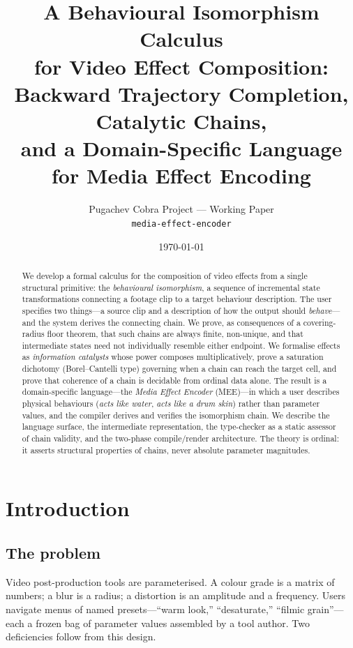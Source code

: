 \documentclass[twocolumn,11pt,a4paper]{article}
\title{\bfseries A Behavioural Isomorphism Calculus\\
for Video Effect Composition:\\
\large Backward Trajectory Completion, Catalytic Chains,\\
and a Domain-Specific Language for Media Effect Encoding}
\author{%
  \normalsize Pugachev Cobra Project --- Working Paper\\
  \small \texttt{media-effect-encoder}
}
\date{\today}
\theoremstyle{mee}
\theoremstyle{definition}
\theoremstyle{remark}
\begin{document}
\maketitle

\begin{abstract}
\noindent
We develop a formal calculus for the composition of video effects from a
single structural primitive: the \emph{behavioural isomorphism}, a
sequence of incremental state transformations connecting a footage clip to
a target behaviour description. The user specifies two things---a source
clip and a description of how the output should \emph{behave}---and the
system derives the connecting chain. We prove, as consequences of a
covering-radius floor theorem, that such chains are always finite,
non-unique, and that intermediate states need not individually resemble
either endpoint. We formalise effects as \emph{information catalysts}
whose power composes multiplicatively, prove a saturation dichotomy
(Borel--Cantelli type) governing when a chain can reach the target cell,
and prove that coherence of a chain is decidable from ordinal data alone.
The result is a domain-specific language---the \emph{Media Effect
Encoder} (MEE)---in which a user describes physical behaviours
(\emph{acts like water}, \emph{acts like a drum skin}) rather than
parameter values, and the compiler derives and verifies the isomorphism
chain. We describe the language surface, the intermediate representation,
the type-checker as a static assessor of chain validity, and the two-phase
compile/render architecture. The theory is ordinal: it asserts structural
properties of chains, never absolute parameter magnitudes.
\end{abstract}

\section{Introduction}
\label{sec:intro}

\subsection{The problem}

Video post-production tools are parameterised. A colour grade is a matrix
of numbers; a blur is a radius; a distortion is an amplitude and a
frequency. Users navigate menus of named presets---``warm look,''
``desaturate,'' ``filmic grain''---each a frozen bag of parameter values
assembled by a tool author. Two deficiencies follow from this design.
\end{document}
